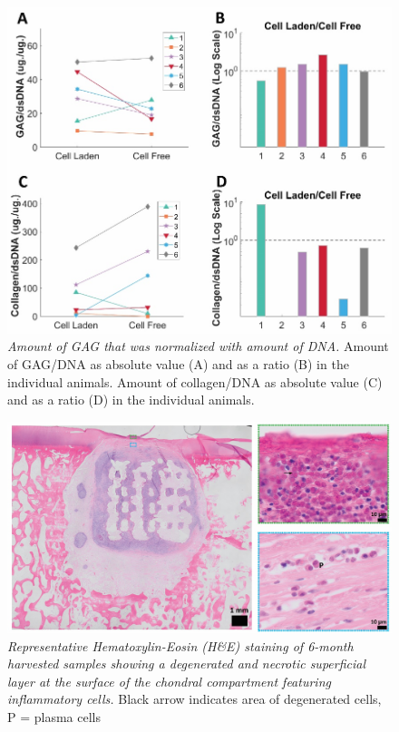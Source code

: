 \documentclass[twocolumn, serif, empirical, authordate, seplic]{jote-article}
\begin{document}
\begin{figure}
\centering \includegraphics[width=\columnwidth]{articles/empirical/horse/media/image14.jpg}
\caption{\emph{Amount of GAG that was normalized with amount of DNA.}  Amount of GAG/DNA as absolute value (A) and as a ratio (B) in the individual animals. Amount of collagen/DNA as absolute value (C) and as a ratio (D) in the individual animals.}
\label{fig:sup3}\end{figure}
\newpage
\twocolumn


\begin{figure}
\centering \includegraphics[width=\columnwidth]{articles/empirical/horse/media/image15.jpg}
\caption{\emph{Representative Hematoxylin-Eosin (H\&E) staining of 6-month harvested samples showing a degenerated and necrotic superficial layer at the surface of the chondral compartment featuring inflammatory cells.}  Black arrow indicates area of degenerated cells, P = plasma cells}
\label{fig:sup4}\end{figure}
\end{document}
